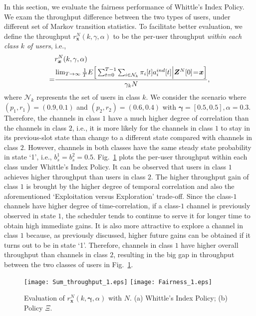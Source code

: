 \documentclass[11pt,twocolumn]{IEEEtran}
\begin{document}
In this section, we evaluate the fairness performance of Whittle's Index Policy. We exam the throughput difference between the two types of users, under different set of Markov transition statistics. To facilitate better evaluation, we define the throughput $r^N_{\bm x}(k,\gamma,\alpha)$ to be the per-user throughput \emph{within each class $k$ of users}, i.e.,
\begin{align*}
&r^N_{\bm x}(k,\gamma,\alpha)\\
=&\frac{\lim_{T\rightarrow \infty}
\frac{1}{T}E \Big[\sum_{t=0}^{T-1} \sum_{i\in \mathcal{N}_k} \pi_i[t]
a_i^{ind}[t] \Big|{\bm Z}^{N}[0]\hspace{-2pt}=\hspace{-2pt}{\bm x} \Big]}{\gamma_k N},
\end{align*}
where $\mathcal{N}_k$ represents the set of users in class $k$. We consider the scenario where $(p_1,r_1)=(0.9,0.1)$ and $(p_2,r_2)=(0.6,0.4)$ with $\bm\gamma=[0.5,0.5], \alpha=0.3$. Therefore, the channels in class $1$ have a much higher degree of correlation than the channels in class $2$, i.e., it is more likely for the channels in class $1$ to stay in its previous-slot state than change to a different state compared with channels in class $2$. However, channels in both classes have the same steady state probability in state `1', i.e., $b_s^1=b_s^2=0.5$. Fig.~\ref{fig:Fairness} plots the per-user throughput within each class under Whittle's Index Policy. It can be observed that users in class $1$ achieves higher throughput than users in class $2$. The higher throughput gain of class $1$ is brought by the higher degree of temporal correlation and also the aforementioned `Exploitation versus Exploration' trade-off. Since the class-$1$ channels have higher degree of time-correlation, if a class-$1$ channel is previously observed in state $1$, the scheduler tends to continue to serve it for longer time to obtain high immediate gains. It is also more attractive to explore a channel in class $1$ because, as previously discussed, higher future gains can be obtained if it turns out to be in state `1'. Therefore, channels in class $1$ have higher overall throughput than channels in class $2$, resulting in the big gap in throughput between the two classes of users in Fig.~\ref{fig:Fairness}.

\begin{figure}
\centering
\texttt{[image: Sum\_throughput\_1.eps]}
\texttt{[image: Fairness\_1.eps]}
\vspace{-3pt} \caption{Evaluation of $r^{N}_{\bm x}(k,\bm \gamma, \alpha)$ with $N$. (a) Whittle's Index Policy; (b) Policy $\Xi$.}
\vspace{-15pt}
\label{fig:Fairness}
\end{figure}
\end{document}
